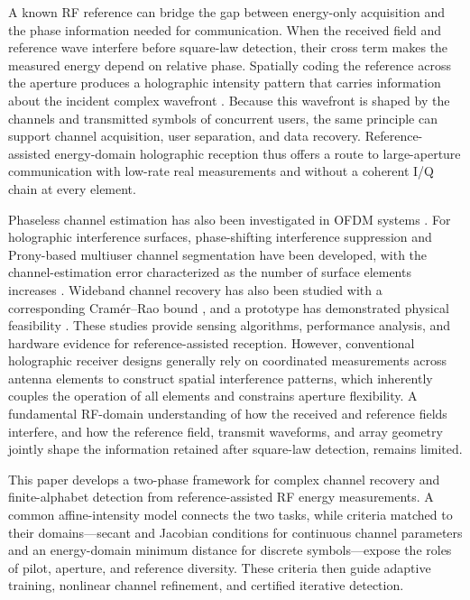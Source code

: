 \documentclass[journal]{IEEEtran}
\begin{document}
A known RF reference can bridge the gap between energy-only acquisition and
the phase information needed for communication. When the received field and
reference wave interfere before square-law detection, their cross term makes
the measured energy depend on relative phase. Spatially coding the reference
across the aperture produces a holographic intensity pattern that carries
information about the incident complex wavefront
\cite{gabor1948new,leith1962wavefronts,yamaguchi1997phase}. Because this
wavefront is shaped by the channels and transmitted symbols of concurrent
users, the same principle can support channel acquisition, user separation,
and data recovery. Reference-assisted energy-domain holographic reception thus
offers a route to large-aperture communication with low-rate real measurements
and without a coherent I/Q chain at every element.

Phaseless channel estimation has also been investigated in OFDM systems \cite{ofdm_phase_retrieval}. For holographic interference surfaces, phase-shifting interference suppression and Prony-based multiuser channel segmentation have been developed, with the channel-estimation error characterized as the number of surface elements increases \cite{huangjd2024CS}. Wideband channel recovery has
also been studied with a corresponding Cram\'er--Rao bound
\cite{huang2026wideband}, and a prototype has demonstrated physical feasibility
\cite{yin2025hisprototype}. These studies provide sensing algorithms,
performance analysis, and hardware evidence for reference-assisted reception\cite{Zhou2024,r1,r3}. However, conventional holographic receiver designs generally rely on coordinated measurements across antenna elements to construct spatial interference patterns, which inherently couples the operation of all elements and constrains aperture flexibility. A fundamental RF-domain understanding of how the received and reference fields interfere, and how the reference field, transmit waveforms, and array geometry jointly shape the information retained after square-law detection, remains limited.

This paper develops a two-phase framework for complex channel recovery and
finite-alphabet detection from reference-assisted RF energy measurements. A
common affine-intensity model connects the two tasks, while criteria matched to
their domains---secant and Jacobian conditions for continuous channel
parameters and an energy-domain minimum distance for discrete symbols---expose
the roles of pilot, aperture, and reference diversity. These criteria then
guide adaptive training, nonlinear channel refinement, and certified iterative
detection.
\end{document}
